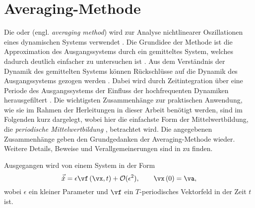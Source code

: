 \chapter{Averaging-Methode} \label{ap:Averaging}



Die  oder   (engl. \textit{averaging method}) wird zur Analyse 
nichtlinearer Oszillationen eines dynamischen Systems verwendet \cite{Mitropolsky:Averaging}. 
Die Grundidee der Methode ist die Approximation des Ausgangssystems durch ein gemitteltes System, welches dadurch 
deutlich einfacher zu untersuchen ist \cite{Hagedorn:NichtlinSchwingungen1978}.
Aus dem Verständnis der Dynamik des gemittelten Systems  können Rückschlüsse auf die 
Dynamik des Ausgangssystems gezogen werden  \cite{Hagedorn:NichtlinSchwingungen1978}. 
Dabei wird durch Zeitintegration über eine Periode des Ausgangssystems  der Einfluss der hochfrequenten Dynamiken 
herausgefiltert \cite{Hagedorn:NichtlinSchwingungen1978}. 
Die wichtigsten Zusammenhänge zur praktischen Anwendung, wie sie im Rahmen der Herleitungen in dieser Arbeit 
benötigt werden, sind im Folgenden kurz dargelegt, wobei hier die einfachste Form der Mittelwertbildung, 
die \textit{periodische Mittelwertbildung} \cite{Sanders:AveragingMethods2007}, betrachtet wird. 
Die  angegebenen Zusammenhänge geben den Grundgedanken der Averaging-Methode wieder.
Weitere Details, Beweise und Verallgemeinerungen sind in \cite{Sanders:AveragingMethods2007} zu finden. 

Ausgegangen wird von einem System in der Form
\begin{equation}
	\vec{\dot{x}} = \epsilon \vf\left(\vx,t\right) + \mathcal{O}(\epsilon^2), \qquad  \vx\left(0\right) = \va,
\label{eq:AveragingAusgangsgleichung}
\end{equation}
wobei $\epsilon$ ein kleiner Parameter und $\vf$ ein $T$-periodisches Vektorfeld in der Zeit $t$ ist.


